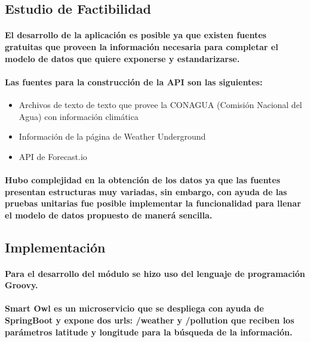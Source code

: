   \subsection{Estudio de Factibilidad}
    \paragraph{El desarrollo de la aplicación es posible ya que existen fuentes gratuitas que proveen la información necesaria para completar el modelo de datos que quiere exponerse y estandarizarse.}

    \paragraph{Las fuentes para la construcción de la API son las siguientes:} 
    \begin{itemize}
      \item Archivos de texto de texto que provee la CONAGUA (Comisión Nacional del Agua) con información climática
      \item Información de la página de Weather Underground
      \item API de Forecast.io
    \end{itemize}
    
    \paragraph{Hubo complejidad en la obtención de los datos ya que las fuentes presentan estructuras muy variadas, sin embargo, con ayuda de las pruebas unitarias fue posible implementar la funcionalidad para llenar el modelo de datos propuesto de manerá sencilla.}
  
  \subsection{Implementación}
  \paragraph{Para el desarrollo del módulo se hizo uso del lenguaje de programación Groovy.} 

  \paragraph{Smart Owl es un microservicio que se despliega con ayuda de SpringBoot y expone dos urls: /weather y /pollution que reciben los parámetros \textbf{latitude} y \textbf{longitude} para la búsqueda de la información.}

